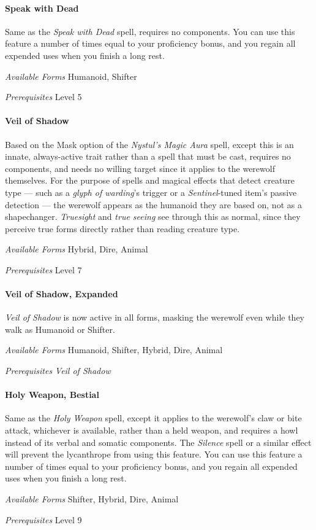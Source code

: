 \documentclass[twocolumn]{dndbook}
\begin{document}
\paragraph*{Speak with Dead}
Same as the \emph{Speak with Dead} spell, requires no components.
You can use this feature a number of times equal to your proficiency bonus, and you regain all expended uses when you finish a long rest.\par
\emph{Available Forms} Humanoid, Shifter\par
\emph{Prerequisites} Level 5\par

\paragraph*{Veil of Shadow}
Based on the Mask option of the \emph{Nystul's Magic Aura} spell, except this is an innate, always-active trait rather than a spell that must be cast, requires no components, and needs no willing target since it applies to the werewolf themselves.
For the purpose of spells and magical effects that detect creature type --- such as a \emph{glyph of warding}'s trigger or a \emph{Sentinel}-tuned item's passive detection --- the werewolf appears as the humanoid they are based on, not as a shapechanger.
\emph{Truesight} and \emph{true seeing} see through this as normal, since they perceive true forms directly rather than reading creature type.\par
\emph{Available Forms} Hybrid, Dire, Animal\par
\emph{Prerequisites} Level 7\par

\paragraph*{Veil of Shadow, Expanded}
\emph{Veil of Shadow} is now active in all forms, masking the werewolf even while they walk as Humanoid or Shifter.\par
\emph{Available Forms} Humanoid, Shifter, Hybrid, Dire, Animal\par
\emph{Prerequisites} \emph{Veil of Shadow}\par

\paragraph*{Holy Weapon, Bestial}
Same as the \emph{Holy Weapon} spell, except it applies to the werewolf's claw or bite attack, whichever is available, rather than a held weapon, and requires a howl instead of its verbal and somatic components.
The \emph{Silence} spell or a similar effect will prevent the lycanthrope from using this feature.
You can use this feature a number of times equal to your proficiency bonus, and you regain all expended uses when you finish a long rest.\par
\emph{Available Forms} Shifter, Hybrid, Dire, Animal\par
\emph{Prerequisites} Level 9\par
\end{document}
